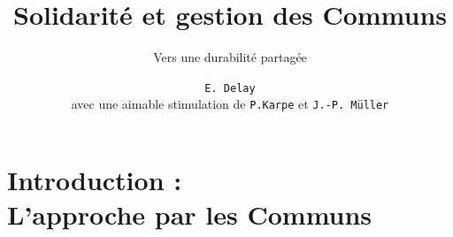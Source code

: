 \documentclass[newPxFont]{beamer}
\title{Solidarité et gestion des Communs}
\subtitle{Vers une durabilité partagée}
\author{\texttt{E. Delay}\\
avec une aimable stimulation de \texttt{P.Karpe} et \texttt{J.-P. Müller}}
\institute{CIRAD -- UMR SENS}
\begin{document}
%
%


\maketitle


%
%


\section{Introduction :\\ L'approche par les Communs}
\end{document}
